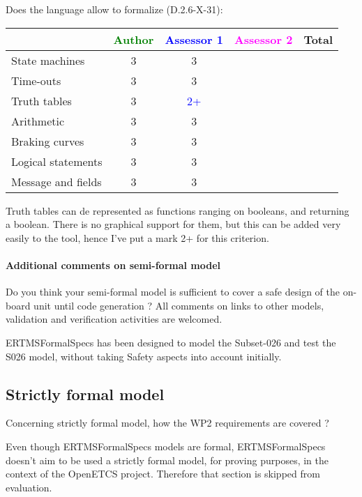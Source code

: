 Does the language allow to  formalize (D.2.6-X-31):

\begin{tabular}{|l | c | c | c | c|}
\hline
& \textcolor{green}{Author} & \textcolor{blue}{Assessor 1} & \textcolor{magenta}{Assessor 2} & Total \\
\hline 
State machines  & 3 & 3 & &  \\
\hline
Time-outs  & 3 & 3 & &  \\
\hline
Truth tables  & 3 & \textcolor{blue}{2+} & &  \\
\hline
Arithmetic  & 3 & 3 & &  \\
\hline
Braking curves  & 3 & 3 & &  \\
\hline
Logical statements & 3 & 3 & &  \\
\hline
Message and fields & 3 & 3 & &  \\
\hline
\end{tabular}

\begin{assessor1}
Truth tables can de represented as functions ranging on booleans, and returning a boolean. There is no graphical support for them, but this can be added very easily to the tool, hence I've put a mark 2+ for this criterion. 
\end{assessor1}

\paragraph{Additional comments on semi-formal  model} Do you think your semi-formal  model is sufficient to cover a safe design of the on-board unit until code generation ?
All comments on links to  other models, validation and verification activities are welcomed.

\begin{author_comment}
ERTMSFormalSpecs has been designed to model the Subset-026 and test the S026 model, without taking Safety aspects into account initially.    
\end{author_comment}
\subsection{Strictly formal model}

Concerning strictly formal model, how the WP2 requirements are covered ?

\begin{author_comment}
Even though ERTMSFormalSpecs models are formal, ERTMSFormalSpecs doesn't aim to be used a strictly formal model, for proving purposes, in the context of the OpenETCS project. Therefore that section is skipped from evaluation.  
\end{author_comment}

